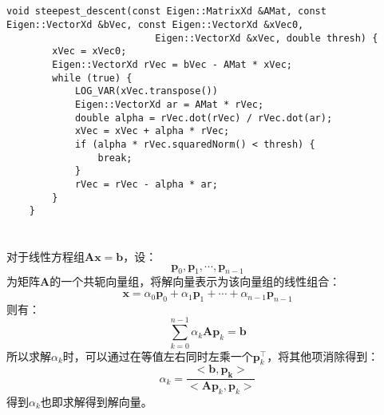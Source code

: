 \documentclass[12pt, onecolumn]{article}
\newcommand\normf{\fangsong}
\begin{document}
	\subsection{\normf{关键代码}}
	\begin{lstlisting}[caption=\normf{最速下降法代码}]
    void steepest_descent(const Eigen::MatrixXd &AMat, const Eigen::VectorXd &bVec, const Eigen::VectorXd &xVec0,
                          Eigen::VectorXd &xVec, double thresh) {
        xVec = xVec0;
        Eigen::VectorXd rVec = bVec - AMat * xVec;
        while (true) {
            LOG_VAR(xVec.transpose())
            Eigen::VectorXd ar = AMat * rVec;
            double alpha = rVec.dot(rVec) / rVec.dot(ar);
            xVec = xVec + alpha * rVec;
            if (alpha * rVec.squaredNorm() < thresh) {
                break;
            }
            rVec = rVec - alpha * ar;
        }
    }
	\end{lstlisting}
	
	\newpage
	\section{\normf{共轭梯度}}
	\subsection{\normf{算法描述}}
	对于线性方程组$\boldsymbol{A}\boldsymbol{x}=\boldsymbol{b}$，设：
	\begin{equation}
	\boldsymbol{p}_0,\boldsymbol{p}_1,\cdots,\boldsymbol{p}_{n-1}
	\end{equation}
	为矩阵$\boldsymbol{A}$的一个共轭向量组，将解向量表示为该向量组的线性组合：
	\begin{equation}
	\boldsymbol{x}=\alpha_0\boldsymbol{p}_0+\alpha_1\boldsymbol{p}_1+\cdots+\alpha_{n-1}\boldsymbol{p}_{n-1}
	\end{equation}
	则有：
	\begin{equation}
	\sum_{k=0}^{n-1}\alpha_k\boldsymbol{A}\boldsymbol{p}_k
	=\boldsymbol{b}
	\end{equation}
	所以求解$\alpha_k$时，可以通过在等值左右同时左乘一个$\boldsymbol{p}_k^\top$，将其他项消除得到：
	\begin{equation}
	\alpha_k=\frac{<\boldsymbol{b,\boldsymbol{p}_k}>}{<\boldsymbol{A}\boldsymbol{p}_k,\boldsymbol{p}_k>}
	\end{equation}
	得到$\alpha_k$也即求解得到解向量。
	
\end{document}
